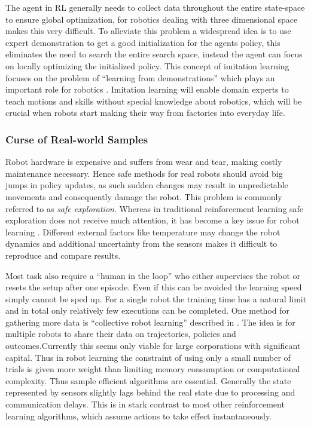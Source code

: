The agent in RL generally needs to collect data throughout the entire
state-space to ensure global optimization, for robotics dealing with
three dimensional space makes this very difficult.
To alleviate this problem  a widespread idea is to use expert demonstration
to get a good initialization for the agents policy, this
eliminates the need to search the entire search space, instead the
agent can focus on locally optimizing the initialized policy.
This concept of imitation learning focuses on the problem of ``learning
from demonstrations'' which plays an important role
for robotics \citet{Osaetal18}. Imitation learning
will enable domain experts to teach motions and
skills without special knowledge about robotics, which will be crucial
when robots start making their way from factories into everyday life.

\subsubsection{Curse of Real-world Samples}
Robot hardware is expensive and suffers from wear and tear, making
costly maintenance necessary. Hence safe methods for real robots
should avoid big jumps in policy updates, as such sudden changes may
result in unpredictable movements and consequently damage the robot.
This problem is commonly referred to as \textit{safe exploration}.
Whereas in traditional reinforcement learning
safe exploration does not receive much attention,
it has become a key issue for robot learning \citet{schneider1997exploiting}.
Different external factors like temperature may change the robot dynamics and
additional uncertainty from the sensors makes it difficult to reproduce and
compare results.

Most task also require a ``human in the loop'' who either supervises the robot
or resets the setup after one episode. Even if this can be avoided the learning
speed simply cannot be sped up.
For a single robot the training time has a natural limit
and in total only relatively few executions can be completed.
One method for gathering more data is ``collective robot learning'' described in
\citet{kehoe2015survey}. The idea is for multiple robots to
share their data on trajectories, policies and outcomes.Currently this seems only
viable for large corporations with significant capital.
Thus in robot learning the constraint of using only a small number of trials
is given more weight than limiting memory consumption or computational complexity.
Thus sample efficient algorithms are essential.
Generally the state represented by sensors slightly lags behind the real
state due to processing and communication delays. This is in stark contrast to
most other reinforcement learning algorithms, which assume actions to take effect
instantaneously.

